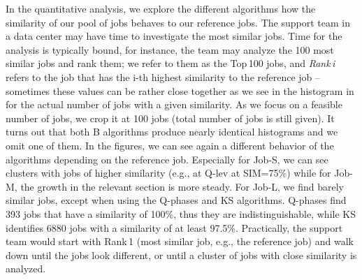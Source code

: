 \documentclass{jhps}
\begin{document}
In the quantitative analysis, we explore the different algorithms how the similarity of our pool of jobs behaves to our reference jobs.
The support team in a data center may have time to investigate the most similar jobs.
Time for the analysis is typically bound, for instance, the team may analyze the 100 most similar jobs and rank them; we refer to them as the Top\,100 jobs, and \textit{Rank\,i} refers to the job that has the i-th highest similarity to the reference job -- sometimes these values can be rather close together as we see in the histogram in
 for the actual number of jobs with a given similarity.
As we focus on a feasible number of jobs, we crop it at 100 jobs (total number of jobs is still given).
It turns out that both B algorithms produce nearly identical histograms and we omit one of them.
In the figures, we can see again a different behavior of the algorithms depending on the reference job.
Especially for Job-S, we can see clusters with jobs of higher similarity (e.g., at Q-lev at SIM=75\%) while for Job-M, the growth in the relevant section is more steady.
For Job-L, we find barely similar jobs, except when using the Q-phases and KS algorithms.
Q-phases find 393 jobs that have a similarity of 100\%, thus they are indistinguishable, while KS identifies 6880 jobs with a similarity of at least 97.5\%.
Practically, the support team would start with Rank\,1 (most similar job, e.g., the reference job) and walk down until the jobs look different, or until a cluster of jobs with close similarity is analyzed.

%
%
%
\end{document}
